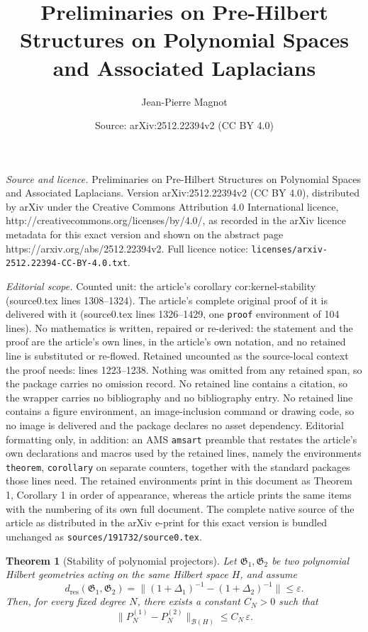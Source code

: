 \documentclass[10pt,a4paper]{amsart}
\title{Preliminaries on Pre-Hilbert Structures on Polynomial Spaces and Associated Laplacians}
\author{Jean-Pierre Magnot}
\date{Source: arXiv:2512.22394v2 (CC BY 4.0)}
\newtheorem{theorem}{Theorem}
\begin{document}
\maketitle

\noindent\emph{Source and licence.} Preliminaries on Pre-Hilbert Structures on Polynomial Spaces and Associated Laplacians. Version arXiv:2512.22394v2 (CC BY 4.0), distributed by arXiv under the Creative Commons Attribution 4.0 International licence, http://creativecommons.org/licenses/by/4.0/, as recorded in the arXiv licence metadata for this exact version and shown on the abstract page https://arxiv.org/abs/2512.22394v2. Full licence notice: \texttt{licenses/arxiv-2512.22394-CC-BY-4.0.txt}.\par\smallskip

\noindent\textit{Editorial scope.} Counted unit: the article's corollary cor:kernel-stability (source0.tex lines 1308--1324). The article's complete original proof of it is delivered with it (source0.tex lines 1326--1429, one \texttt{proof} environment of 104 lines). No mathematics is written, repaired or re-derived: the statement and the proof are the article's own lines, in the article's own notation, and no retained line is substituted or re-flowed.  Retained uncounted as the source-local context the proof needs: lines 1223--1238.  Nothing was omitted from any retained span, so the package carries no omission record.  No retained line contains a citation, so the wrapper carries no bibliography and no bibliography entry.  No retained line contains a figure environment, an image-inclusion command or drawing code, so no image is delivered and the package declares no asset dependency.  Editorial formatting only, in addition: an AMS \texttt{amsart} preamble that restates the article's own declarations and macros used by the retained lines, namely the environments \texttt{theorem}, \texttt{corollary} on separate counters, together with the standard packages those lines need.  The retained environments print in this document as Theorem 1, Corollary 1 in order of appearance, whereas the article prints the same items with the numbering of its own full document.  The complete native source of the article as distributed in the arXiv e-print for this exact version is bundled unchanged as \texttt{sources/191732/source0.tex}.
\begin{theorem}[Stability of polynomial projectors]
\label{thm:projector-stability}
Let $\mathfrak G_1,\mathfrak G_2$ be two polynomial Hilbert geometries acting on the same
Hilbert space $H$, and assume
\[
d_{\mathrm{res}}(\mathfrak G_1,\mathfrak G_2)
=
\big\|(1+\Delta_1)^{-1}-(1+\Delta_2)^{-1}\big\|
\le \varepsilon.
\]
Then, for every fixed degree $N$, there exists a constant $C_N>0$ such that
\[
\|P_N^{(1)}-P_N^{(2)}\|_{\mathcal B(H)}
\le C_N\,\varepsilon.
\]
\end{theorem}
\end{document}
